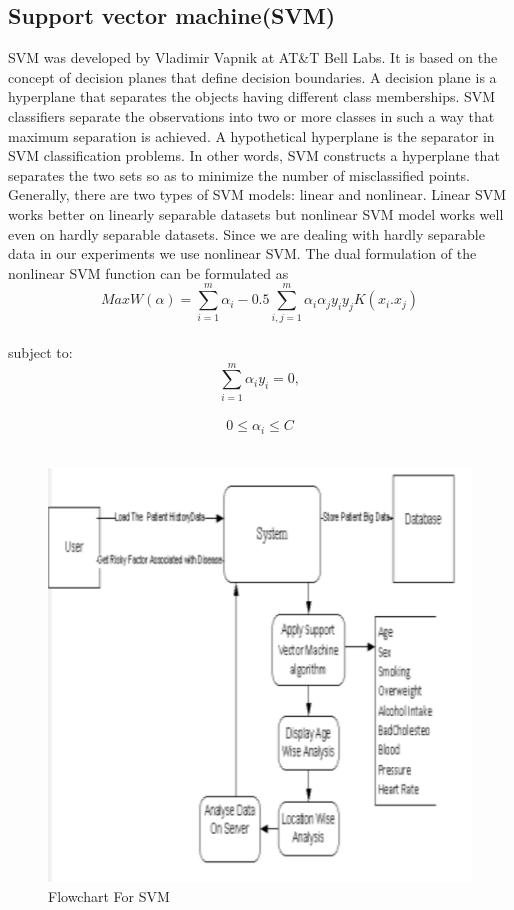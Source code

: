 \documentclass{book}
\begin{document}
    	\subsection{Support vector machine(SVM)}
    	SVM was developed by Vladimir Vapnik at AT\&T Bell Labs. It is based on the concept of decision planes that define decision boundaries. A decision plane is a hyperplane that separates the objects having different class memberships. SVM classifiers separate the observations into two or more classes in such a way that maximum separation is achieved. A hypothetical hyperplane is the separator in SVM classification problems.  In other words, SVM constructs a hyperplane that separates the two sets so as to minimize the number of misclassified points. Generally, there are two types of SVM models: linear and nonlinear. Linear SVM works better on linearly separable datasets but nonlinear SVM model works well even on hardly separable datasets. Since we are dealing with hardly separable data in our experiments we use nonlinear SVM. The dual formulation of the nonlinear SVM function can be formulated as
    	\[ MaxW(\alpha) = \sum_{i=1}^{m}\alpha_i - 0.5\sum_{i, j=1}^{m}\alpha_i \alpha_j y_i y_j K(x_i . x_j) \]\\
    	subject to:
    	\[\sum_{i=1}^{m}\alpha_i y_i = 0 ,\]\\
    	\[ 0 \leq \alpha_i \leq C \]\\
    	\begin{figure}
    		\begin{center}
    			\includegraphics[width=14cm]{images/svm.png}
    			\caption{Flowchart For SVM}
    		\end{center}
    	\end{figure}
\end{document}
